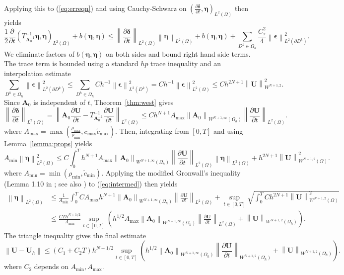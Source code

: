 \documentclass{siamart0216}
\newcommand{\pd}[2]{\frac{\partial#1}{\partial#2}}
\newcommand{\nor}[1]{\left\| #1 \right\|}
\newcommand{\LRp}[1]{\left( #1 \right)}
\newcommand{\Oh}{{\Omega_h}}
\renewcommand{\L}{L^2\LRp{\Omega}}
\newcommand{\Lk}{L^2\LRp{D^k}}
\newcommand{\Ldk}{L^2\LRp{\partial D^k}}
\begin{document}
Applying this to (\ref{eq:erreqn}) and using Cauchy-Schwarz on $\LRp{\pd{\bm{\delta}}{t},\bm{\eta}}_{\L}$ then yields
\[
\frac{1}{2}\pd{}{t}\LRp{T^{-1}_{\bm{A}_0^{-1}}\bm{\eta},\bm{\eta}}_{\L} + b(\bm{\eta},\bm{\eta}) \leq \nor{\pd{\bm{\delta}}{t}}_{\L} \nor{\bm{\eta}}_{\L} +  b(\bm{\eta},\bm{\eta}) + \sum_{D^k \in \Oh}\frac{ C_\tau^2}{4} \nor{\bm{\epsilon}}_{\Ldk}^2.
\]
We eliminate factors of $b(\bm{\eta},\bm{\eta})$ on both sides and bound right hand side terms.  The trace term is bounded using a standard $hp$ trace inequality \cite{warburton2003constants} and an interpolation estimate
\[
\sum_{D^k \in \Oh} \nor{\bm{\epsilon}}_{\Ldk}^2 \leq \sum_{D^k \in \Oh} C h^{-1} \nor{\bm{\epsilon}}_{\Lk}^2 = Ch^{-1} \nor{\bm{\epsilon}}^2_{\L} \leq Ch^{2N+1} \nor{\bm{U}}^2_{W^{N+1,2}}.  
\]
Since $\bm{A}_0$ is independent of $t$, Theorem~\ref{thm:west} gives
\[
\nor{\pd{\bm{\delta}}{t}}_{\L} = \nor{\bm{A}_0 \pd{\bm{U}}{t} - T_{\bm{A}_0^{-1}}^{-1}\pd{\bm{U}}{t}}_{\L} \leq C h^{N+1} {A}_{\max} \nor{\bm{A}_0}_{W^{N+1,\infty}(\Oh)}\nor{\pd{\bm{U}}{t}}_{\L}.
\]
where $A_{\max} = \max\LRp{\frac{\rho_{\max}}{\rho_{\min}}, c_{\max} \tilde{c}_{\max}}$.  Then, integrating from $[0,T]$ and using Lemma~\ref{lemma:props} yields 
\begin{equation}
A_{\min} \nor{\bm{\eta}}^2_{\L} \leq C\int_0^T  h^{N+1}A_{\max}\nor{\bm{A}_0}_{W^{N+1,\infty}(\Oh)}\nor{\pd{\bm{U}}{t}}_{\L} \nor{\bm{\eta}}_{\L} + h^{2N+1} \nor{\bm{U}}^2_{W^{N+1,2}(\Omega)}.
\label{eq:intermed}
\end{equation}
where $A_{\min} =\min\LRp{ \rho_{\min}, \tilde{c}_{\min}}$.  Applying the modified Gronwall's inequality (Lemma 1.10 in \cite{dolejvsi2015discontinuous}; see also \cite{chan2016weight1}) to (\ref{eq:intermed}) then yields
\begin{align*}
\nor{\bm{\eta}}_{\L} &\leq \frac{1}{A_{\min}} \int_0^T CA_{\max} h^{N+1}\nor{\bm{A}_0}_{W^{N+1,\infty}(\Oh)}\nor{\pd{\bm{U}}{t}}_{\L} + \sup_{t\in [0,T]} \sqrt{\int_0^T C h^{2N+1} \nor{\bm{U}}^2_{W^{N+1,2}(\Omega)}}\\
&\leq \frac{C T h^{N+1/2}}{A_{\min}} \sup_{t \in [0,T]}\LRp{h^{1/2} A_{\max}\nor{\bm{A}_0}_{W^{N+1,\infty}(\Oh)}\nor{\pd{\bm{U}}{t}}_{\L}  +  \nor{\bm{U}}_{W^{N+1,2}(\Oh)}}.
\end{align*}
The triangle inequality gives the final estimate
\[
\nor{\bm{U}-\bm{U}_h} \leq \LRp{C_1 + C_2 T} h^{N + 1/2}\sup_{t \in [0,T]}\LRp{ h^{1/2}\nor{\bm{A}_0}_{W^{N+1,\infty}(\Oh)}\nor{\pd{\bm{U}}{t}}_{W^{N+1,2}(\Oh)}+\nor{\bm{U}}_{W^{N+1,2}(\Oh)}}.
\]
where $C_2$ depends on $A_{\min}, A_{\max}$.  
\end{document}
